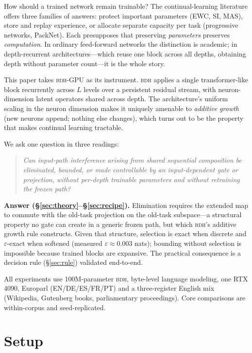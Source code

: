 \documentclass[11pt]{article}
\theoremstyle{remark}\newtheorem{remark}{Remark}
\newcommand{\BDH}{\textsc{bdh}}
\begin{document}
How should a trained network remain trainable? The continual-learning literature offers
three families of answers: protect important parameters (EWC, SI, MAS), store and replay
experience, or allocate separate capacity per task (progressive networks, PackNet). Each
presupposes that preserving \emph{parameters} preserves \emph{computation}. In ordinary
feed-forward networks the distinction is academic; in depth-recurrent architectures---which
reuse one block across all depths, obtaining depth without parameter count---it is the whole
story.

This paper takes \BDH{}-GPU as its instrument. \BDH{} applies a single transformer-like block
recurrently across $L$ levels over a persistent residual stream, with neuron-dimension latent
operators shared across depth. The architecture's uniform scaling in the neuron dimension
makes it uniquely amenable to \emph{additive growth} (new neurons append; nothing else
changes), which turns out to be the property that makes continual learning tractable.

We ask one question in three readings:
\begin{quote}\itshape
Can input-path interference arising from shared sequential composition be eliminated,
bounded, or made controllable by an input-dependent gate or projection, without per-depth
trainable parameters and without retraining the frozen path?
\end{quote}

\noindent\textbf{Answer (\S\ref{sec:theory}--\S\ref{sec:recipe}).}
Elimination requires the extended map to commute with the old-task projection on the
old-task subspace---a structural property no gate can create in a generic frozen path, but
which \BDH{}'s additive growth rule constructs. Given that structure, selection is exact when
discrete and $\varepsilon$-exact when softened (measured $\varepsilon \approx 0.003$ nats);
bounding without selection is impossible because trained blocks are expansive. The practical
consequence is a decision rule (\S\ref{sec:rule}) validated end-to-end.

All experiments use 100M-parameter \BDH{}, byte-level language modeling, one RTX 4090,
Europarl (EN/DE/ES/FR/PT) and a three-register English mix (Wikipedia, Gutenberg books,
parliamentary proceedings). Core comparisons are within-corpus and seed-replicated.

\section{Setup}
\label{sec:setup}
\end{document}
